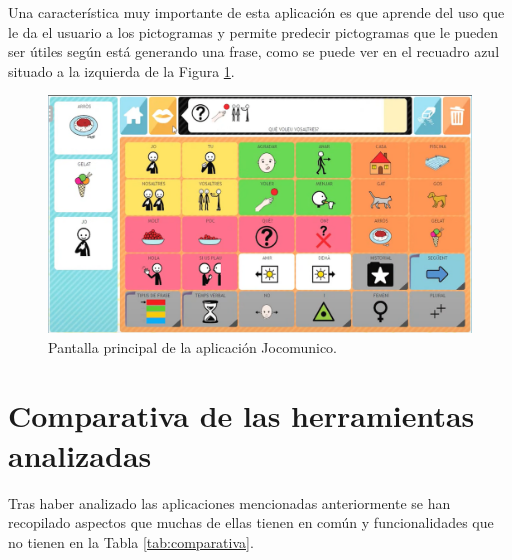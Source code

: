 Una característica muy importante de esta aplicación es que aprende del uso que le da el usuario a los pictogramas y permite predecir pictogramas que le pueden ser útiles según está generando una frase, como se puede ver en el recuadro azul situado a la izquierda de la Figura \ref{fig:jocomunico}.

\begin{figure}[h!]
	\centering
	\includegraphics[width=0.7\linewidth]{Imagenes/Bitmap/jocomunico}
	\caption{Pantalla principal de la aplicación Jocomunico.}
	\label{fig:jocomunico}
\end{figure}


\section{Comparativa de las herramientas analizadas}
\label{cap2:tablacomparativa}
Tras haber analizado las aplicaciones mencionadas anteriormente se han recopilado aspectos que muchas de ellas tienen en común y funcionalidades que no tienen en la Tabla \ref{tab:comparativa}.



